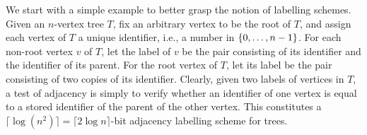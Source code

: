 \documentclass[twoside,leqno]{article}
\newcommand{\vida}[1]{\noindent{\color{pink} VD: #1}}
\newcommand{\cyril}[1]{\noindent\textcolor{Green}{CG: #1}}
\newcommand{\Oh}{O}
\DeclarePairedDelimiter{\set}{\{}{\}}
\begin{document}
We start with a simple example to better grasp the notion of labelling schemes. 
Given an $n$-vertex tree $T$, fix an arbitrary vertex to be the root of $T$, and assign each vertex of $T$ a unique identifier, i.e., a number in $\set{0,\ldots,n-1}$.
For each non-root vertex $v$ of $T$,
let the label of $v$ be
the pair consisting of its identifier and the identifier of its parent.
For the root vertex of $T$, let its label be
the pair consisting of two copies of its identifier.
Clearly, given two labels of vertices in $T$,
a test of adjacency is simply to verify whether an identifier of one vertex is equal to a stored identifier of the parent of the other vertex.
This constitutes a $\lceil\log(n^2)\rceil = \lceil2\log{n}\rceil$-bit adjacency labelling scheme for trees.
%
%
%
%
%
%
%
\end{document}
